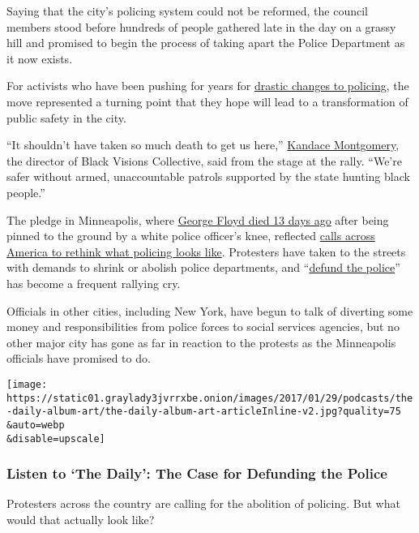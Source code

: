 Saying that the city's policing system could not be reformed, the
council members stood before hundreds of people gathered late in the day
on a grassy hill and promised to begin the process of taking apart the
Police Department as it now exists.

For activists who have been pushing for years for
\href{https://www.nytimes3xbfgragh.onion/2020/06/20/us/minnesota-police-george-floyd.html}{drastic
changes to policing}, the move represented a turning point that they
hope will lead to a transformation of public safety in the city.

``It shouldn't have taken so much death to get us here,''
\href{https://www.netrootsnation.org/profile/kandace-montgomery/}{Kandace
Montgomery}, the director of Black Visions Collective, said from the
stage at the rally. ``We're safer without armed, unaccountable patrols
supported by the state hunting black people.''

The pledge in Minneapolis, where
\href{https://www.nytimes3xbfgragh.onion/2020/05/31/us/george-floyd-investigation.html}{George
Floyd died 13 days ago} after being pinned to the ground by a white
police officer's knee, reflected
\href{https://www.nytimes3xbfgragh.onion/2020/06/05/us/defund-police-floyd-protests.html}{calls
across America to rethink what policing looks like}. Protesters have
taken to the streets with demands to shrink or abolish police
departments, and
``\href{https://www.nytimes3xbfgragh.onion/2020/06/08/us/what-does-defund-police-mean.html}{defund
the police}'' has become a frequent rallying cry.

Officials in other cities, including New York, have begun to talk of
diverting some money and responsibilities from police forces to social
services agencies, but no other major city has gone as far in reaction
to the protests as the Minneapolis officials have promised to do.

\texttt{[image: https://static01.graylady3jvrrxbe.onion/images/2017/01/29/podcasts/the-daily-album-art/the-daily-album-art-articleInline-v2.jpg?quality=75\\\&auto=webp\\\&disable=upscale]}

\hypertarget{listen-to-the-daily-the-case-for-defunding-the-police}{%
\subsubsection{Listen to `The Daily': The Case for Defunding the
Police}\label{listen-to-the-daily-the-case-for-defunding-the-police}}

Protesters across the country are calling for the abolition of policing.
But what would that actually look like?

